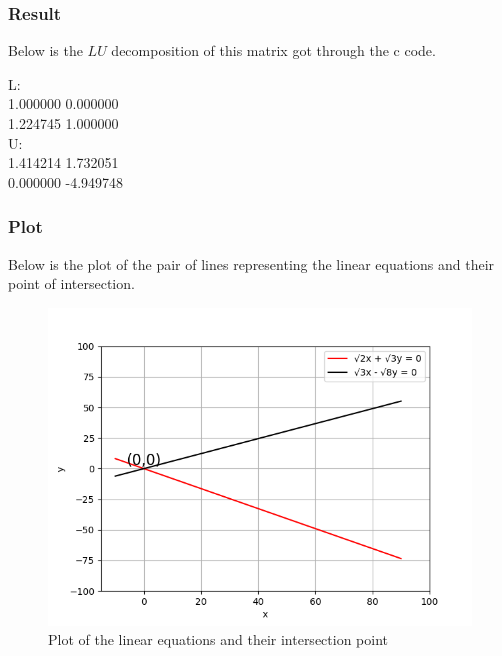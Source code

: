 \documentclass{beamer}
\theoremstyle{remark}
\numberwithin{equation}{section}
\begin{document}
\begin{frame}
	\frametitle{Result}
	Below is the $LU$ decomposition of this matrix got through the c code.

L:\\
1.000000  0.000000\\
1.224745  1.000000\\
U:\\
1.414214 1.732051\\
0.000000 -4.949748

\end{frame}
\begin{frame}
	\frametitle{Plot}
	Below is the plot of the pair of lines representing the linear equations and their point of intersection.
\begin{figure}[h!]
	\centering
	\includegraphics[width=0.6\columnwidth]{figs/simulated.png}
	\caption{Plot of the linear equations and their intersection point}
	\label{label}
\end{figure}
\end{frame}
\end{document}
